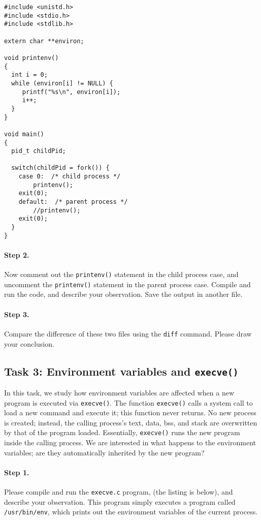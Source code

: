 \begin{Verbatim}[frame=single]
#include <unistd.h>
#include <stdio.h>
#include <stdlib.h>

extern char **environ;

void printenv()
{
  int i = 0;
  while (environ[i] != NULL) {
     printf("%s\n", environ[i]);
     i++;
  }
}

void main()
{
  pid_t childPid;

  switch(childPid = fork()) {
    case 0:  /* child process */
        printenv();
	exit(0);
    default:  /* parent process */
        //printenv();
	exit(0);
  }
}
\end{Verbatim}

\paragraph{Step 2.} Now comment out the {\tt printenv()} statement in
the child process case, and uncomment the {\tt printenv()} statement in
the parent process case. Compile and run the code, and describe your 
observation. Save the output in another file.


\paragraph{Step 3.} Compare the difference of these two files using 
the {\tt diff} command. Please draw your conclusion.



\subsection{Task 3: Environment variables and {\tt execve()}}

In this task, we study how environment variables are affected
when a new program is 
executed via {\tt execve()}. The 
function {\tt execve()} calls a system call to load 
a new command and execute it; this function never returns. 
No new process is created; instead, the calling 
process's text,  data, bss, and stack  are overwritten by that of 
the program loaded. Essentially, {\tt execve()} runs the new program inside
the calling process. We are interested in what happens to the 
environment variables; are they automatically inherited by the 
new program?


\paragraph{Step 1.} Please compile and run the {\tt execve.c} program,
(the listing is below), and describe your observation. This program simply executes
a program called {\tt /usr/bin/env}, which prints out the environment
variables of the current process.


